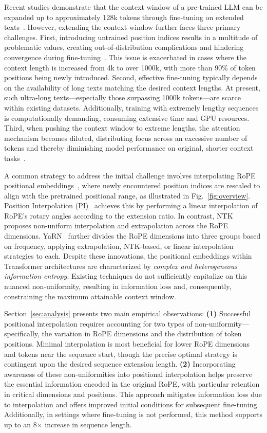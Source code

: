 Recent studies demonstrate that the context window of a pre-trained LLM can be expanded up to approximately 128k tokens through fine-tuning on extended texts~\cite{longlora,pi,yarn,zhang2024soaring,liu2023scaling}. However, extending the context window further faces three primary challenges. First, introducing untrained position indices results in a multitude of problematic values, creating out-of-distribution complications and hindering convergence during fine-tuning~\cite{pi}. This issue is exacerbated in cases where the context length is increased from 4k to over 1000k, with more than 90\% of token positions being newly introduced. Second, effective fine-tuning typically depends on the availability of long texts matching the desired context lengths. At present, such ultra-long texts—especially those surpassing 1000k tokens—are scarce within existing datasets. Additionally, training with extremely lengthy sequences is computationally demanding, consuming extensive time and GPU resources. Third, when pushing the context window to extreme lengths, the attention mechanism becomes diluted, distributing focus across an excessive number of tokens and thereby diminishing model performance on original, shorter context tasks~\cite{pi}.

A common strategy to address the initial challenge involves interpolating RoPE positional embeddings~\cite{rope,pi}, where newly encountered position indices are rescaled to align with the pretrained positional range, as illustrated in Fig.~\ref{fig:overview}. Position Interpolation (PI)~\cite{pi} achieves this by performing a linear interpolation of RoPE's rotary angles according to the extension ratio. In contrast, NTK~\cite{ntk,dynamicntk} proposes non-uniform interpolation and extrapolation across the RoPE dimensions. YaRN~\cite{yarn} further divides the RoPE dimensions into three groups based on frequency, applying extrapolation, NTK-based, or linear interpolation strategies to each. Despite these innovations, the positional embeddings within Transformer architectures are characterized by \emph{complex and heterogeneous information entropy}. Existing techniques do not sufficiently capitalize on this nuanced non-uniformity, resulting in information loss and, consequently, constraining the maximum attainable context window.

Section~\ref{sec:analysis} presents two main empirical observations: \textbf{(1)} Successful positional interpolation requires accounting for two types of non-uniformity—specifically, the variation in RoPE dimensions and the distribution of token positions. Minimal interpolation is most beneficial for lower RoPE dimensions and tokens near the sequence start, though the precise optimal strategy is contingent upon the desired sequence extension length. \textbf{(2)} Incorporating awareness of these non-uniformities into positional interpolation helps preserve the essential information encoded in the original RoPE, with particular retention in critical dimensions and positions. This approach mitigates information loss due to interpolation and offers improved initial conditions for subsequent fine-tuning. Additionally, in settings where fine-tuning is not performed, this method supports up to an 8$\times$ increase in sequence length.

